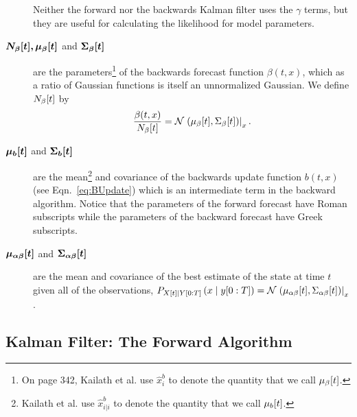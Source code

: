 \begin{description}
  Neither the forward nor the backwards Kalman filter uses the $\gamma$
  terms, but they are useful for calculating the likelihood for model
  parameters.
\item[$\bm{{N_\beta}{[t]},{\mu_\beta}{[t]}}$ and
  $\bm{{\Sigma_\beta}{[t]}}$] are the parameters\footnote{On page
    342, Kailath et al.\cite{KSH00} use $\hat x_i^b$ to denote the
    quantity that we call ${\mu_\beta}{[t]}$.} of the
  backwards forecast function $\beta(t,x)$, which as a ratio of
  Gaussian functions is itself an unnormalized Gaussian.  We define
  ${N_\beta}{[t]}$ by
  \begin{equation*}
    \frac{\beta(t,x)}{{N_\beta}{[t]}} =
    {\mathcal{N}}\left.\left({\mu_\beta}{[t]},{\Sigma_\beta}{[t]}\right)\right|_{x}.
  \end{equation*}
\item[$\bm{{\mu_b}{[t]}}$ and $\bm{{\Sigma_b}{[t]}}$] are the
  mean\footnote{Kailath et al.\cite{KSH00} use $\hat x_{i|i}^b$ to
    denote the quantity that we call ${\mu_b}{[t]}$.} and covariance
  of the backwards update function $b(t,x)$ (see Eqn.~\eqref{eq:BUpdate})
  which is an intermediate term in the backward algorithm.  Notice
  that the parameters of the forward forecast have Roman subscripts
  while the parameters of the backward forecast have Greek subscripts.
\item[$\bm{{\mu_{\alpha\beta}}{[t]}}$ and
  $\bm{{\Sigma_{\alpha\beta}}{[t]}}$] are the mean and covariance
  of the best estimate of the state at time $t$ given all of the
  observations, \ie $P_{{X}{[t]}\mid Y[0:T]} \left(x\mid y[0:T]
  \right) =
  {\mathcal{N}}\left.\left({\mu_{\alpha\beta}}{[t]},{\Sigma_{\alpha\beta}}{[t]}\right)\right|_{x}$.
\end{description}


\subsection{Kalman Filter: The Forward Algorithm}

